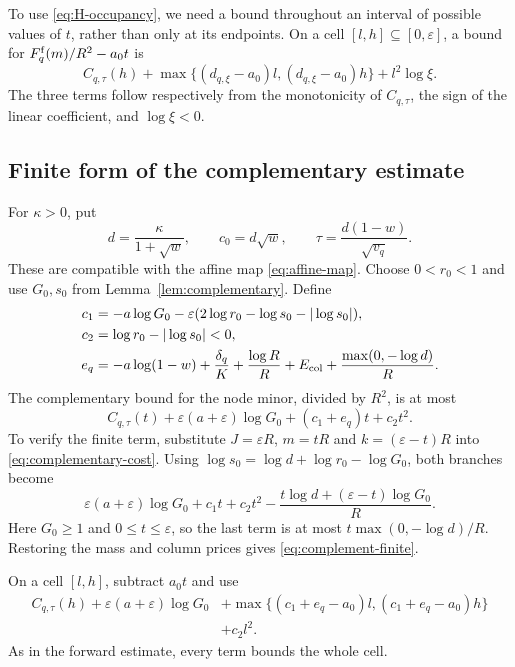 To use \eqref{eq:H-occupancy}, we need a bound throughout an interval
of possible values of $t$, rather than only at its endpoints. On a cell
$[l,h]\subseteq[0,\varepsilon]$, a bound for
$F_q^{\rm f}(m)/R^2-a_0t$ is
\begin{equation}\label{eq:forward-cell}
 C_{q,\tau}(h)
 +\max\{(d_{q,\xi}-a_0)l,(d_{q,\xi}-a_0)h\}
 +l^2\log\xi.
\end{equation}
The three terms follow respectively from the monotonicity of
$C_{q,\tau}$, the sign of the linear coefficient, and $\log\xi<0$.

\subsection{Finite form of the complementary estimate}
For $\kappa>0$, put
\[
 d=\frac{\kappa}{1+\sqrt w},\qquad c_0=d\sqrt w,
 \qquad \tau=\frac{d(1-w)}{\sqrt{v_q}}.
\]
These are compatible with the affine map \eqref{eq:affine-map}.
Choose $0<r_0<1$ and use $G_0,s_0$ from
Lemma~\ref{lem:complementary}. Define
\begin{align*}
 c_1&=-a\log G_0-\varepsilon
                  (2\log r_0-\log s_0-|\log s_0|),\\
 c_2&=\log r_0-|\log s_0|<0,\\
 e_q&=-a\log(1-w)+\frac{\delta_q}{K}
          +\frac{\log R}{R}+E_{\rm col}
          +\frac{\max(0,-\log d)}{R}.
\end{align*}
The complementary bound for the node minor, divided by $R^2$, is at most
\begin{equation}\label{eq:complement-finite}
 C_{q,\tau}(t)+\varepsilon(a+\varepsilon)\log G_0
                          +(c_1+e_q)t+c_2t^2.
\end{equation}
To verify the finite term, substitute $J=\varepsilon R$, $m=tR$ and
$k=(\varepsilon-t)R$ into \eqref{eq:complementary-cost}. Using
$\log s_0=\log d+\log r_0-\log G_0$, both branches become
\[
 \varepsilon(a+\varepsilon)\log G_0+c_1t+c_2t^2
       -\frac{t\log d+(\varepsilon-t)\log G_0}{R}.
\]
Here $G_0\geq1$ and $0\leq t\leq\varepsilon$, so the last term is at
most $t\max(0,-\log d)/R$. Restoring the mass and column prices gives
\eqref{eq:complement-finite}.

On a cell $[l,h]$, subtract $a_0t$ and use
\begin{equation}\label{eq:complement-cell}
 \begin{split}
 C_{q,\tau}(h)+\varepsilon(a+\varepsilon)\log G_0
 &+\max\{(c_1+e_q-a_0)l,(c_1+e_q-a_0)h\}\\
 &+c_2l^2.
 \end{split}
\end{equation}
As in the forward estimate, every term bounds the whole cell.

